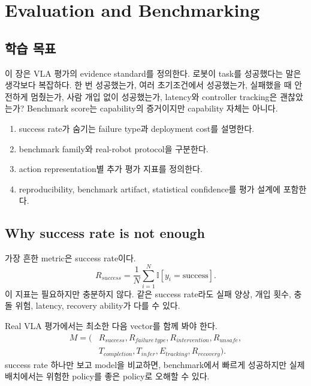 \chapter{Evaluation and Benchmarking}

\section*{학습 목표}

이 장은 VLA 평가의 evidence standard를 정의한다. 로봇이 task를 성공했다는 말은 생각보다 복잡하다. 한 번 성공했는가, 여러 초기조건에서 성공했는가, 실패했을 때 안전하게 멈췄는가, 사람 개입 없이 성공했는가, latency와 controller tracking은 괜찮았는가? Benchmark score는 capability의 증거이지만 capability 자체는 아니다.

\begin{enumerate}
  \item success rate가 숨기는 failure type과 deployment cost를 설명한다.
  \item benchmark family와 real-robot protocol을 구분한다.
  \item action representation별 추가 평가 지표를 정의한다.
  \item reproducibility, benchmark artifact, statistical confidence를 평가 설계에 포함한다.
\end{enumerate}

\section{Why success rate is not enough}

가장 흔한 metric은 success rate이다.
\begin{equation}
  R_{success}
  =
  \frac{1}{N}
  \sum_{i=1}^{N}
  \mathbb{I}[y_i=\mathrm{success}].
  \label{eq:ch16-success-rate}
\end{equation}
이 지표는 필요하지만 충분하지 않다. 같은 success rate라도 실패 양상, 개입 횟수, 충돌 위험, latency, recovery ability가 다를 수 있다.

Real VLA 평가에서는 최소한 다음 vector를 함께 봐야 한다.
\begin{equation}
  \begin{aligned}
  M
  =
  (&
  R_{success},
  R_{failure\ type},
  R_{intervention},
  R_{unsafe},\\
  &
  T_{completion},
  T_{infer},
  E_{tracking},
  R_{recovery}
  ).
  \end{aligned}
  \label{eq:ch16-metric-vector}
\end{equation}
success rate 하나만 보고 model을 비교하면, benchmark에서 빠르게 성공하지만 실제 배치에서는 위험한 policy를 좋은 policy로 오해할 수 있다.

